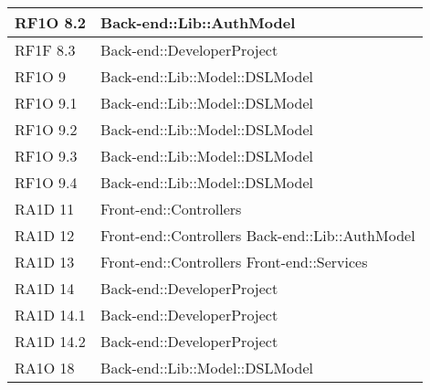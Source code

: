 \begin{center}
\begin{longtable}{|p{3cm}|p{7cm}|}
      RF1O 8.2 & Back-end::Lib::AuthModel \\ \hline
      RF1F 8.3 & Back-end::DeveloperProject \\ \hline
      RF1O 9 & Back-end::Lib::Model::DSLModel \\ \hline
      RF1O 9.1 & Back-end::Lib::Model::DSLModel \\ \hline
      RF1O 9.2 & Back-end::Lib::Model::DSLModel \\ \hline
      RF1O 9.3 & Back-end::Lib::Model::DSLModel \\ \hline
      RF1O 9.4 & Back-end::Lib::Model::DSLModel \\ \hline
      RA1D 11 & Front-end::Controllers \\ \hline
      RA1D 12 & Front-end::Controllers \newline     
      			Back-end::Lib::AuthModel \\ \hline
      RA1D 13 & Front-end::Controllers \newline
      			Front-end::Services \\ \hline
      RA1D 14 &	Back-end::DeveloperProject \\ \hline
      RA1D 14.1 & Back-end::DeveloperProject \\ \hline
      RA1D 14.2 & Back-end::DeveloperProject \\ \hline
      RA1O 18 & Back-end::Lib::Model::DSLModel \\ \hline
		      
       \end{longtable}
      \egroup
      \end{center}  
\clearpage